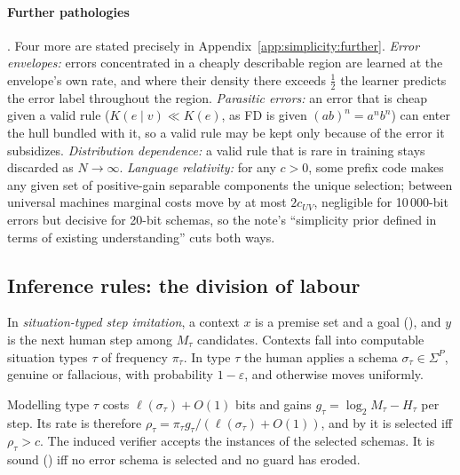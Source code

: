 \paragraph{Further pathologies} . Four more are stated precisely in Appendix~\ref{app:simplicity:further}. \emph{Error envelopes:} errors concentrated in a cheaply describable region are learned at the envelope's own rate, and where their density there exceeds $\frac12$ the learner predicts the error label throughout the region. \emph{Parasitic errors:} an error that is cheap given a valid rule ($K(e\mid v)\ll K(e)$, as FD is given $(ab)^n=a^nb^n$) can enter the hull bundled with it, so a valid rule may be kept only because of the error it subsidizes. \emph{Distribution dependence:} a valid rule that is rare in training stays discarded as $N\to\infty$. \emph{Language relativity:} for any $c>0$, some prefix code makes any given set of positive-gain separable components the unique selection; between universal machines marginal costs move by at most $2c_{UV}$, negligible for 10\,000-bit errors but decisive for 20-bit schemas, so the note's ``simplicity prior defined in terms of existing understanding'' cuts both ways.

\subsection{Inference rules: the division of labour}\label{sec:simplicity:division}

In \emph{situation-typed step imitation}, a context $x$ is a premise set and a goal (), and $y$ is the next human step among $M_\tau$ candidates. Contexts fall into computable situation types $\tau$ of frequency $\pi_\tau$. In type $\tau$ the human applies a schema $\sigma_\tau\in\Sigma^P$, genuine or fallacious, with probability $1-\varepsilon$, and otherwise moves uniformly.

Modelling type $\tau$ costs $\ell(\sigma_\tau)+O(1)$ bits and gains $g_\tau=\log_2M_\tau-H_\tau$ per step. Its rate is therefore $\rho_\tau=\pi_\tau g_\tau/(\ell(\sigma_\tau)+O(1))$, and by  it is selected iff $\rho_\tau>c$. The induced verifier accepts the instances of the selected schemas. It is sound () iff no error schema is selected and no guard has eroded.

